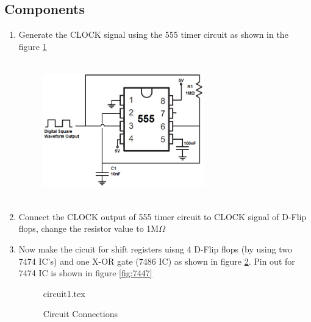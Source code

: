 \documentclass[12pt]{article}
\begin{document}
\fi
\subsection{Components}


\renewcommand{\theequation}{\theenumi}
\renewcommand{\thefigure}{\theenumi}
\begin{enumerate}[label=\thesubsection.\arabic*.,ref=\thesubsection.\theenumi]
\item Generate the CLOCK signal using the 555 timer circuit as shown in the figure \ref{fig:1}
\begin{figure}[!ht]
\includegraphics[width=7cm, height=6cm]{random_number/figs/555.png}
\label{fig:1}
\end{figure}	
	
\item Connect the CLOCK output of 555 timer circuit to CLOCK signal of D-Flip flops, change the resistor value to 1M$\Omega$		
\item Now make the cicuit for shift registers uisng 4 D-Flip flops (by using two 7474 IC's) and one X-OR gate (7486 IC) as shown in figure \ref{fig:2}. Pin out for 7474 IC is shown in figure \ref{fig:7447}
\begin{figure}
\centering

{circuit1.tex}
\caption{Circuit Connections}
\label{fig:2}
\end{figure}

\begin{figure}[!ht]
\begin{center}


\end{center}
\end{figure}
\end{enumerate}
\end{document}
